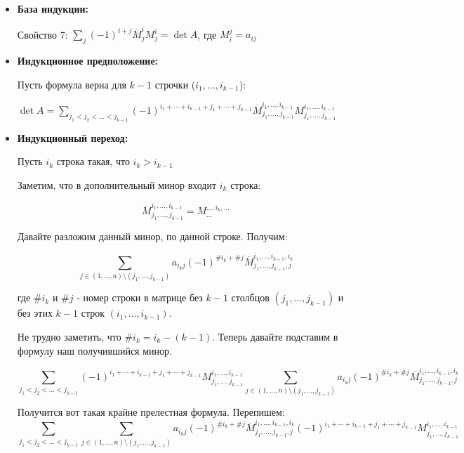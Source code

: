 \begin{itemize}
    \item \textbf{База индукции:}

          Свойство 7: \(\sum\limits_{j}(-1)^{i+j}\overline{M}_j^i M_j^i = \det A\), где $M_i^j = a_{ij}$

    \item \textbf{Индукционное предположение:}

          Пусть формула верна для \(k-1\) строчки ($i_1,\ldots, i_{k-1}$):


          \(\det A = \sum\limits_{j_1<j_2<\ldots<j_{k-1}} (-1)^{i_1 + \cdots + i_{k-1}+j_1 + \cdots + j_{k-1}} \overline{M}_{j_1,\ldots, j_{k-1}}^{i_1,\ldots,i_{k-1}}M_{j_1,\ldots, j_{k-1}}^{i_1,\ldots,i_{k-1}}\)


    \item \textbf{Индукционный переход:}

          Пусть $i_k$ строка такая, что $i_k > i_{k - 1}$

          Заметим, что в дополнительный минор входит $i_k$ строка:

          \[\overline{M}_{j_1, \ldots, j_{k - 1}}^{i_1, \ldots, i_{k - 1}} = M_{\ldots}^{\ldots, i_k, \ldots}\]

          Давайте разложим данный минор, по данной строке. Получим:


          \[\sum\limits_{j \in (1, \ldots, n) \setminus (j_1, \ldots, j_{k-1})} a_{i_k j} (-1)^{\# i_k + \# j} \overline{M}_{j_1, \ldots, j_{k - 1},j}^{i_1, \ldots, i_{k - 1}, i_k}\]

          где $\#i_k$ и $\# j$ - номер строки в матрице без $k-1$ столбцов $(j_1, \dots, j_{k-1})$  и без этих $k-1$ строк $(i_1, \dots, i_{k-1})$.


          Не трудно заметить, что \(\# i_k = i_k - (k - 1)\). Теперь давайте подставим в формулу наш получившийся минор.


          \small\[\sum\limits_{j_1<j_2<\ldots<j_{k-1}} (-1)^{i_1 + \cdots + i_{k-1}+j_1 + \cdots + j_{k-1}} M_{j_1,\ldots, j_{k-1}}^{i_1,\ldots,i_{k-1}} \sum\limits_{j \in (1, \ldots, n) \setminus (j_1, \ldots, j_{k-1})} a_{i_k j} (-1)^{\# i_k + \# j} \overline{M}_{j_1, \ldots, j_{k - 1},j}^{i_1, \ldots, i_{k - 1}, i_k}\]\normalsize

          Получится вот такая крайне прелестная формула. Перепишем:
          \small\[\sum\limits_{j_1<j_2<\ldots<j_{k-1}}  \sum\limits_{j \in (1, \ldots, n) \setminus (j_1, \ldots, j_{k-1})} a_{i_k j} (-1)^{\# i_k + \# j} \overline{M}_{j_1, \ldots, j_{k - 1},j}^{i_1, \ldots, i_{k - 1}, i_k} (-1)^{i_1 + \cdots + i_{k-1}+j_1 + \cdots + j_{k-1}} M_{j_1,\ldots, j_{k-1}}^{i_1,\ldots,i_{k-1}}\]\normalsize



\end{itemize}
